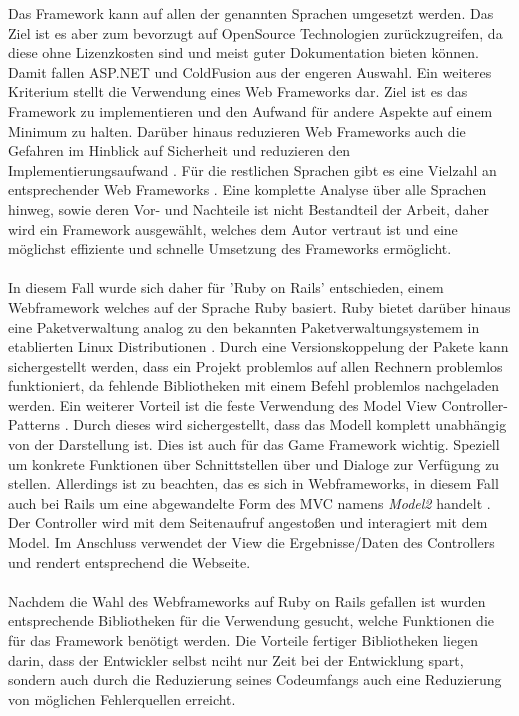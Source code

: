 Das Framework kann auf allen der genannten Sprachen umgesetzt werden.
Das Ziel ist es aber zum bevorzugt auf OpenSource Technologien zurückzugreifen, da diese ohne Lizenzkosten sind und meist guter Dokumentation bieten können. Damit fallen ASP.NET und ColdFusion aus der engeren Auswahl. Ein weiteres Kriterium stellt die Verwendung eines Web Frameworks dar. Ziel ist es das Framework zu implementieren und den Aufwand für andere Aspekte auf einem Minimum zu halten. Darüber hinaus reduzieren Web Frameworks auch die Gefahren im Hinblick auf Sicherheit \cite{Livshits.2007} und reduzieren den Implementierungsaufwand \cite{Schwabe.2001}. Für die restlichen Sprachen gibt es eine Vielzahl an entsprechender Web Frameworks \cite{Weinberger.2011}. Eine komplette Analyse über alle Sprachen hinweg, sowie deren Vor- und Nachteile ist nicht Bestandteil der Arbeit, daher wird ein Framework ausgewählt, welches dem Autor vertraut ist und eine möglichst effiziente und schnelle Umsetzung des Frameworks ermöglicht.
\\\\
In diesem Fall wurde sich daher für 'Ruby on Rails' entschieden, einem Webframework welches auf der Sprache Ruby basiert. Ruby bietet darüber hinaus eine Paketverwaltung analog zu den bekannten Paketverwaltungsystemem in etablierten Linux Distributionen \cite{Bachle.2007}. Durch eine Versionskoppelung der Pakete kann sichergestellt werden, dass ein Projekt problemlos auf allen Rechnern problemlos funktioniert, da fehlende Bibliotheken mit einem Befehl problemlos nachgeladen werden.
Ein weiterer Vorteil ist die feste Verwendung des Model View Controller-Patterns \cite{Tate.2006}. Durch dieses wird sichergestellt, dass das Modell komplett unabhängig von der Darstellung ist. Dies ist auch für das Game Framework wichtig. Speziell um konkrete Funktionen über Schnittstellen über und Dialoge zur Verfügung zu stellen. Allerdings ist zu beachten, das es sich in Webframeworks, in diesem Fall auch bei Rails um eine abgewandelte Form des MVC namens \textit{Model2} handelt \cite{Qiuhui.2002}. Der Controller wird mit dem Seitenaufruf angestoßen und interagiert mit dem Model. Im Anschluss verwendet der View die Ergebnisse/Daten des Controllers und rendert entsprechend die Webseite.
\\\\
Nachdem die Wahl des Webframeworks auf Ruby on Rails gefallen ist wurden entsprechende Bibliotheken für die Verwendung gesucht, welche Funktionen die für das Framework benötigt werden.
Die Vorteile fertiger Bibliotheken liegen darin, dass der Entwickler selbst nciht nur Zeit bei der Entwicklung spart, sondern auch durch die Reduzierung seines Codeumfangs auch eine Reduzierung von möglichen Fehlerquellen erreicht.

